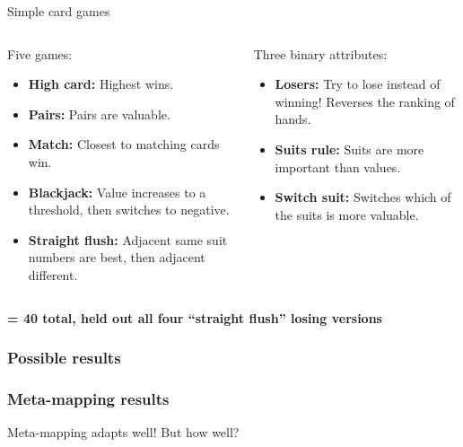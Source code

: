 \documentclass{beamer}
\begin{document}
\begin{frame}{Simple card games}

\begin{columns}
\begin{column}{0.5\textwidth}
Five games:
\begin{itemize}
\item \textbf{High card:} Highest wins.
\item \textbf{Pairs:} Pairs are valuable. 
\item \textbf{Match:} Closest to matching cards win. 
\item \textbf{Blackjack:} Value increases to a threshold, then switches to negative. 
\item \textbf{Straight flush:} Adjacent same suit numbers are best, then adjacent different. 
\end{itemize}
\end{column}

\begin{column}{0.5\textwidth}
Three binary attributes:
\begin{itemize}
\item \textbf{Losers:} Try to lose instead of winning! Reverses the ranking of hands.
\item \textbf{Suits rule:} Suits are more important than values. 
\item \textbf{Switch suit:} Switches which of the suits is more valuable.
\end{itemize}
\vspace{3.2em}
\end{column}
\end{columns}
\vspace{1em}
\textbf{= 40 total, held out all four ``straight flush'' losing versions}
\end{frame}


\begin{frame}
\frametitle<1>{Possible results}
\frametitle<2->{Meta-mapping results}
\end{frame}

\begin{frame}[standout]
Meta-mapping adapts well! But how well?
\end{frame}
\end{document}

